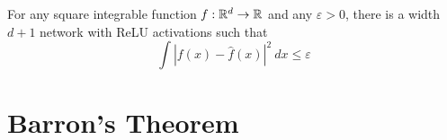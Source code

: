 \begin{theorem}[Park et al.]
	For any square integrable function $f:\mathbb{R}^d\to\mathbb{R}$ and any $\varepsilon > 0$, there is a width $d + 1$ network with ReLU activations such that 
	\begin{equation*}
		\int|f(x) - \hat{f}(x)|^2~dx\le\varepsilon
	\end{equation*}
\end{theorem}

\section{Barron's Theorem}
